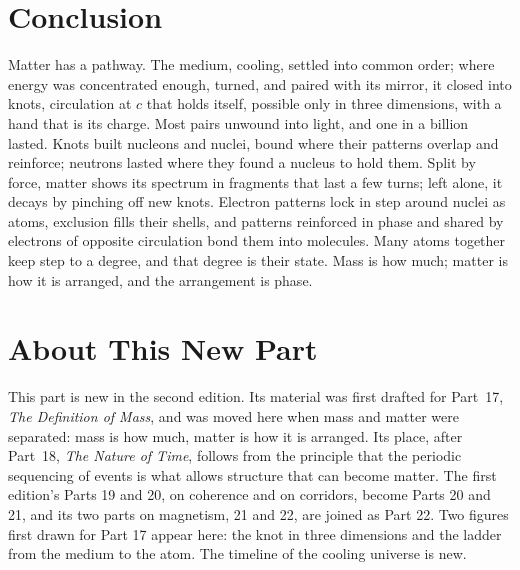 \documentclass[11pt,a4paper]{article}
\begin{document}
\section*{Conclusion}

Matter has a pathway. The medium, cooling, settled into common order; where energy was concentrated enough, turned, and paired with its mirror, it closed into knots, circulation at $c$ that holds itself, possible only in three dimensions, with a hand that is its charge. Most pairs unwound into light, and one in a billion lasted. Knots built nucleons and nuclei, bound where their patterns overlap and reinforce; neutrons lasted where they found a nucleus to hold them. Split by force, matter shows its spectrum in fragments that last a few turns; left alone, it decays by pinching off new knots. Electron patterns lock in step around nuclei as atoms, exclusion fills their shells, and patterns reinforced in phase and shared by electrons of opposite circulation bond them into molecules. Many atoms together keep step to a degree, and that degree is their state. Mass is how much; matter is how it is arranged, and the arrangement is phase.

\section*{About This New Part}

This part is new in the second edition. Its material was first drafted for Part~17, \emph{The Definition of Mass}, and was moved here when mass and matter were separated: mass is how much, matter is how it is arranged. Its place, after Part~18, \emph{The Nature of Time}, follows from the principle that the periodic sequencing of events is what allows structure that can become matter. The first edition's Parts 19 and 20, on coherence and on corridors, become Parts 20 and 21, and its two parts on magnetism, 21 and 22, are joined as Part 22. Two figures first drawn for Part 17 appear here: the knot in three dimensions and the ladder from the medium to the atom. The timeline of the cooling universe is new.

\newpage


\end{document}
